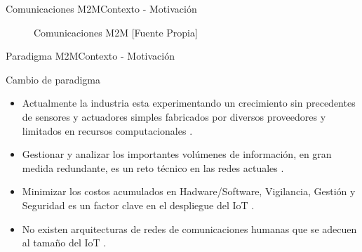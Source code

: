 \begin{frame}{Comunicaciones M2M}{Contexto - Motivación}
\begin{figure}[htbp]
	    \centering
	    \caption{Comunicaciones M2M [Fuente Propia]}
	    \label{fig:M2M}
    \end{figure}
\end{frame}
\begin{frame}{Paradigma M2M}{Contexto - Motivación}
\begin{block}{Cambio de paradigma}
  \begin{itemize}
    \justifying
    \item<1-|alert@1> Actualmente la industria esta experimentando un crecimiento sin precedentes de sensores y actuadores simples fabricados por diversos proveedores y limitados en recursos computacionales \cite{M2MARCHITECTUREPERFORMANCE}. 
    \item<2-|alert@2> Gestionar y analizar los importantes volúmenes de información, en gran medida redundante, es un reto técnico en las redes actuales \cite{IOTIPV6MIPV6}.
    \item<3-|alert@3> Minimizar los costos acumulados en Hadware/Software, Vigilancia, Gestión y Seguridad es un factor clave en el despliegue del IoT \cite{RethinkIOT}.
    \item<4-|alert@4> No existen arquitecturas de redes de comunicaciones humanas que se adecuen al tamaño del IoT \cite{RethinkIOT}. 
  \end{itemize}
 \end{block}
\end{frame}
